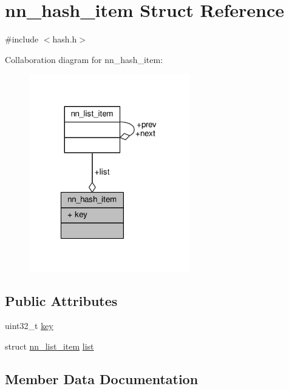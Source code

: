 \hypertarget{structnn__hash__item}{}\section{nn\+\_\+hash\+\_\+item Struct Reference}
\label{structnn__hash__item}


{\ttfamily \#include $<$hash.\+h$>$}



Collaboration diagram for nn\+\_\+hash\+\_\+item\+:\nopagebreak
\begin{figure}[H]
\begin{center}
\leavevmode
\includegraphics[width=198pt]{structnn__hash__item__coll__graph}
\end{center}
\end{figure}
\subsection*{Public Attributes}
\begin{DoxyCompactItemize}
\item 
uint32\+\_\+t \hyperlink{structnn__hash__item_a0c08a2cdf14f38f101faade8a1ee1101}{key}
\item 
struct \hyperlink{structnn__list__item}{nn\+\_\+list\+\_\+item} \hyperlink{structnn__hash__item_ab52f9314ec727442f49da157796b0a89}{list}
\end{DoxyCompactItemize}


\subsection{Member Data Documentation}
